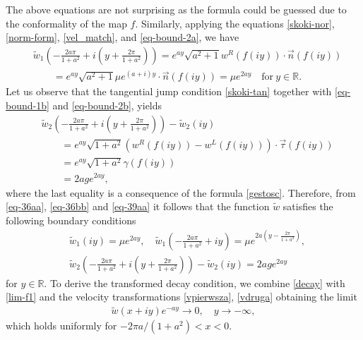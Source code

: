 \documentclass[11pt, letterpaper, reqno]{amsart}
\numberwithin{equation}{section}
\theoremstyle{definition}
\theoremstyle{plain}
\numberwithin{equation}{section}
\def\R{\mathbb{R}}
\begin{document}
The above equations are not surprising as the formula could be guessed due to the conformality of the map $f$. Similarly, applying the equations \eqref{skoki-nor}, \eqref{norm-form}, \eqref{vel_match}, and \eqref{eq-bound-2a}, we have
\begin{equation}
\begin{aligned}\label{eq-36bb}
& \tilde{w}_{1}\left(-\frac{2a\pi}{1+a^2} + i\left(y + \frac{2\pi}{1+a^2}\right)\right) = e^{ay} \sqrt{a^2+1}  w^{R}(f(iy)) \cdot \vec{n}(f(iy)) \\
&\qquad = e^{ay} \sqrt{a^2+1} \mu e^{(a+i)y} \cdot \vec{n}(f(iy)) = \mu e^{2ay} \quad \text{for} \  y\in\R.
\end{aligned}
\end{equation}
Let us observe that the tangential jump condition \eqref{skoki-tan} together with \eqref{eq-bound-1b} and \eqref{eq-bound-2b}, yields
\begin{equation}
\begin{aligned}\label{eq-39aa}
& \tilde{w}_{2}\left(-\frac{2a\pi}{1+a^2} + i\left(y + \frac{2\pi}{1+a^2}\right)\right) - \tilde{w}_{2}(iy) \\
& \qquad = e^{ay}\sqrt{1+a^2}(w^{R}(f(iy))-w^{L}(f(iy)))\cdot\vec{\tau}(f(iy)) \\
& \qquad = e^{ay}\sqrt{1+a^2}\gamma(f(iy)) \\
& \qquad = 2ag e^{2ay},
\end{aligned}
\end{equation}
where the last equality is a consequence of the formula \eqref{gestosc}. Therefore, from \eqref{eq-36aa}, \eqref{eq-36bb} and \eqref{eq-39aa} it follows that the function $\tilde w$ satisfies the following boundary conditions
\begin{align}\label{eq-36}
& \tilde{w}_{1}(iy) = \mu e^{2ay}, \quad \tilde{w}_{1}\left(-\frac{2a\pi}{1+a^2} + iy\right) = \mu e^{2a(y - \frac{2\pi}{1+a^2})}, \\ \label{eq-39}
& \tilde{w}_{2}\left(-\frac{2a\pi}{1+a^2} + i\left(y + \frac{2\pi}{1+a^2}\right)\right) - \tilde{w}_{2}(iy) = 2ag e^{2ay}
\end{align}
for $y\in\R$. To derive the transformed decay condition, we combine \eqref{decay} with \eqref{lim-f1} and the velocity transformations \eqref{vpierwsza}, \eqref{vdruga} obtaining the limit
\begin{align}\label{v-decay}
\tilde{w}(x+iy)e^{-ay} \to 0, \quad y\to-\infty,
\end{align}
which holds uniformly for  $-2\pi a/(1+a^2)<x<0$. 
\end{document}

